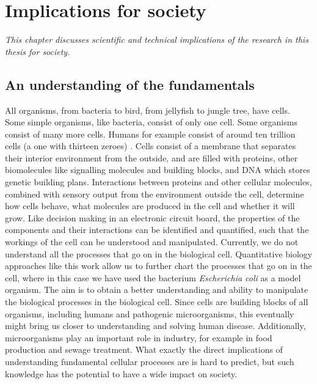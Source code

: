 




\chapter{Implications for society}

\textit{This chapter discusses scientific and technical implications of the research in this thesis for society.}


\section{An understanding of the fundamentals}
\label{section:society:fundamentals}

All organisms, from bacteria to bird, from jellyfish to jungle tree, have cells. 
%
Some simple organisms, like bacteria, consist of only one cell.
Some organisms consist of many more cells.
Humans for example consist of around ten trillion cells (a one with thirteen zeroes) \cite[BNID 102390]{Milo2010}.
%
Cells consist of a membrane that separates their interior environment from the outside,
and are filled with proteins, other biomolecules like signalling molecules and building blocks, and DNA which stores genetic building plans.
%
Interactions between proteins and other cellular molecules, combined with sensory output from the environment outside the cell, 
determine how cells behave, what molecules are produced in the cell and whether it will grow.
%
Like decision making in an electronic circuit board,
the properties of the components and their interactions can be identified and quantified,
such that the workings of the cell can be understood and manipulated.
%
Currently, we do not understand all the processes that go on in the biological cell.
%
Quantitative biology approaches like this work allow us to further chart the processes that go on in the cell,
where in this case we have used the bacterium \textit{Escherichia coli} as a model organism.
%
The aim is to obtain a better understanding and ability to manipulate the biological processes in the biological cell.
%
Since cells are building blocks of all organisms, 
including humans and pathogenic microorganisms,
this eventually might bring us closer to understanding and solving human disease.
%
Additionally, microorganisms play an important role in industry,
for example in food production and sewage treatment.
%
What exactly the direct implications of understanding fundamental cellular processes are is hard to predict,
but such knowledge has the potential to have a wide impact on society.

